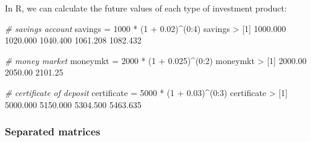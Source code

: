 \documentclass[
]{book}
\newenvironment{Shaded}{\begin{snugshade}}{\end{snugshade}}
\newcommand{\CommentTok}[1]{\textcolor[rgb]{0.56,0.35,0.01}{\textit{#1}}}
\newcommand{\DecValTok}[1]{\textcolor[rgb]{0.00,0.00,0.81}{#1}}
\newcommand{\FloatTok}[1]{\textcolor[rgb]{0.00,0.00,0.81}{#1}}
\newcommand{\NormalTok}[1]{#1}
\newcommand{\OtherTok}[1]{\textcolor[rgb]{0.56,0.35,0.01}{#1}}
\newcommand{\SpecialCharTok}[1]{\textcolor[rgb]{0.00,0.00,0.00}{#1}}
\begin{document}
In R, we can calculate the future values of each type of investment product:

\begin{Shaded}
\begin{Highlighting}[]
\CommentTok{\# savings account}
\NormalTok{savings }\OtherTok{=} \DecValTok{1000} \SpecialCharTok{*}\NormalTok{ (}\DecValTok{1} \SpecialCharTok{+} \FloatTok{0.02}\NormalTok{)}\SpecialCharTok{\^{}}\NormalTok{(}\DecValTok{0}\SpecialCharTok{:}\DecValTok{4}\NormalTok{)}
\NormalTok{savings}
\SpecialCharTok{\textgreater{}}\NormalTok{ [}\DecValTok{1}\NormalTok{] }\FloatTok{1000.000} \FloatTok{1020.000} \FloatTok{1040.400} \FloatTok{1061.208} \FloatTok{1082.432}
\end{Highlighting}
\end{Shaded}

\begin{Shaded}
\begin{Highlighting}[]
\CommentTok{\# money market}
\NormalTok{moneymkt }\OtherTok{=} \DecValTok{2000} \SpecialCharTok{*}\NormalTok{ (}\DecValTok{1} \SpecialCharTok{+} \FloatTok{0.025}\NormalTok{)}\SpecialCharTok{\^{}}\NormalTok{(}\DecValTok{0}\SpecialCharTok{:}\DecValTok{2}\NormalTok{)}
\NormalTok{moneymkt}
\SpecialCharTok{\textgreater{}}\NormalTok{ [}\DecValTok{1}\NormalTok{] }\FloatTok{2000.00} \FloatTok{2050.00} \FloatTok{2101.25}
\end{Highlighting}
\end{Shaded}

\begin{Shaded}
\begin{Highlighting}[]
\CommentTok{\# certificate of deposit}
\NormalTok{certificate }\OtherTok{=} \DecValTok{5000} \SpecialCharTok{*}\NormalTok{ (}\DecValTok{1} \SpecialCharTok{+} \FloatTok{0.03}\NormalTok{)}\SpecialCharTok{\^{}}\NormalTok{(}\DecValTok{0}\SpecialCharTok{:}\DecValTok{3}\NormalTok{)}
\NormalTok{certificate}
\SpecialCharTok{\textgreater{}}\NormalTok{ [}\DecValTok{1}\NormalTok{] }\FloatTok{5000.000} \FloatTok{5150.000} \FloatTok{5304.500} \FloatTok{5463.635}
\end{Highlighting}
\end{Shaded}

\hypertarget{separated-matrices}{%
\subsubsection*{Separated matrices}\label{separated-matrices}}
\end{document}
